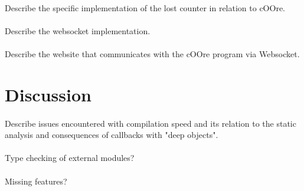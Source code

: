 \documentclass[paper=a4, fontsize=11pt]{article}
\numberwithin{equation}{section}	%
\numberwithin{figure}{section}		%
\numberwithin{table}{section}		%
\begin{document}
        \paragraph{}
            Describe the specific implementation of the lost counter in relation to cOOre.
            
        \paragraph{}
            Describe the websocket implementation.
            
        \paragraph{}
            Describe the website that communicates with the cOOre program via Websocket.
        
            
\section {Discussion}
    
    \paragraph{}
        Describe issues encountered with compilation speed and its relation to the static analysis and consequences of callbacks with "deep objects".
    
    \paragraph{}
        Type checking of external modules?

    \paragraph{}
        Missing features?
\end{document}

